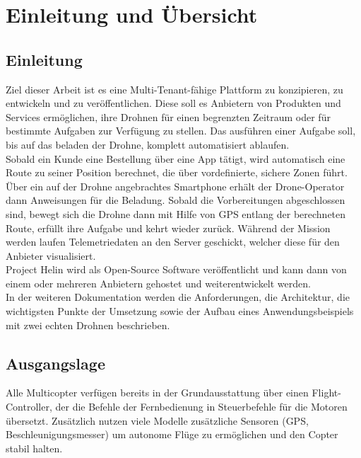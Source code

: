 \chapter{Einleitung und Übersicht}

\section{Einleitung}

Ziel dieser Arbeit ist es eine Multi-Tenant-fähige Plattform zu konzipieren, zu entwickeln und zu veröffentlichen. Diese soll es Anbietern von Produkten und Services ermöglichen, ihre Drohnen für einen begrenzten Zeitraum oder für bestimmte Aufgaben zur Verfügung zu stellen. Das ausführen einer Aufgabe soll, bis auf das beladen der Drohne, komplett automatisiert ablaufen. \\

Sobald ein Kunde eine Bestellung über eine App tätigt, wird automatisch eine Route zu seiner Position berechnet, die über vordefinierte, sichere Zonen führt. Über ein auf der Drohne angebrachtes Smartphone erhält der Drone-Operator dann Anweisungen für die Beladung. Sobald die Vorbereitungen abgeschlossen sind, bewegt sich die Drohne dann mit Hilfe von GPS entlang der berechneten Route, erfüllt ihre Aufgabe und kehrt wieder zurück. Während der Mission werden laufen Telemetriedaten an den Server geschickt, welcher diese für den Anbieter visualisiert.\\

Project Helin wird als Open-Source Software veröffentlicht und kann dann von einem oder mehreren Anbietern gehostet und weiterentwickelt werden.\\

In der weiteren Dokumentation werden die Anforderungen, die Architektur, die wichtigsten Punkte der Umsetzung sowie der Aufbau eines Anwendungsbeispiels mit zwei echten Drohnen beschrieben.

\section{Ausgangslage}

Alle Multicopter verfügen bereits in der Grundausstattung über einen \Gls{Flight-Controller}, der die Befehle der Fernbedienung in Steuerbefehle für die Motoren übersetzt. Zusätzlich nutzen viele Modelle zusätzliche Sensoren (GPS, Beschleunigungsmesser) um autonome Flüge zu ermöglichen und den Copter stabil halten. \\


